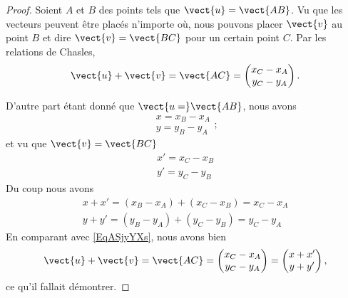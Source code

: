 \begin{proof}
    Soient \( A\) et \( B\) des points tels que \( \vect{ u }=\vect{ AB }\). Vu que les vecteurs peuvent être placés n'importe où, nous pouvons placer \( \vect{ v }\) au point \( B\) et dire \( \vect{ v }=\vect{ BC }\) pour un certain point \( C\). Par les relations de Chasles,
    \begin{equation}    \label{EqASjyYXs}
        \vect{ u }+\vect{ v }=\vect{ AC }=\begin{pmatrix}
            x_C-x_A    \\ 
            y_C-y_A    
        \end{pmatrix}.
    \end{equation}
    
    D'autre part étant donné que \( \vect{ u= }\vect{ AB }\), nous avons
    \begin{subequations}
        \begin{align}
            x=x_B-x_A\\
            y=y_B-y_A
        \end{align};
    \end{subequations}
    et vu que \( \vect{ v }=\vect{ BC }\)
    \begin{subequations}
        \begin{align}
            x'=x_C-x_B\\
            y'=y_C-y_B
        \end{align}
    \end{subequations}
    Du coup nous avons
    \begin{subequations}
        \begin{align}
            x+x'=(x_B-x_A)+(x_C-x_B)=x_C-x_A\\
            y+y'=(y_B-y_A)+(y_C-y_B)=y_C-y_A
        \end{align}
    \end{subequations}
    En comparant avec \eqref{EqASjyYXs}, nous avons bien
    \begin{equation}
        \vect{ u }+\vect{ v }=\vect{ AC }=\begin{pmatrix}
            x_C-x_A    \\ 
            y_C-y_A    
        \end{pmatrix}=\begin{pmatrix}
            x+x'    \\ 
            y+y'    
        \end{pmatrix},
    \end{equation}
    ce qu'il fallait démontrer.
\end{proof}

